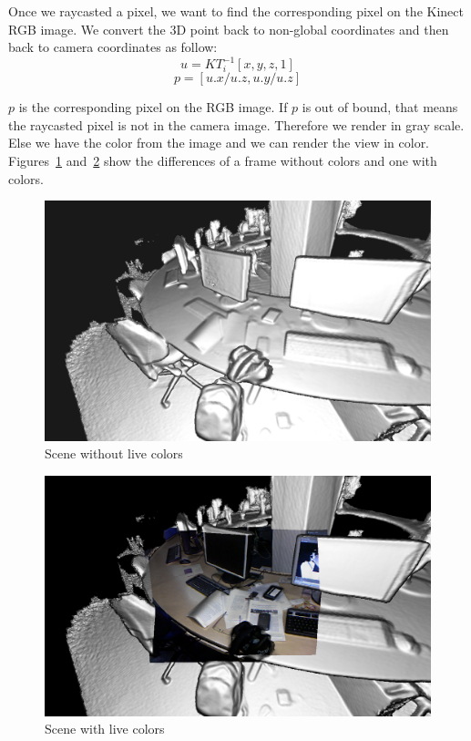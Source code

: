 \documentclass[12pt]{article}
\begin{document}
Once we raycasted a pixel, we want to find the corresponding pixel on the Kinect RGB image. We convert the 3D point back to non-global coordinates and then back to camera coordinates as follow:
$$u = KT_{i}^{-1}[x, y, z, 1]$$
$$p = [u.x/u.z, u.y/u.z]$$

$p$ is the corresponding pixel on the RGB image. If $p$ is out of bound, that means the raycasted pixel is not in the camera image. Therefore we render in gray scale. Else we have the color from the image and we can render the view in color. Figures~\ref{fig:nanb} and~\ref{fig:colorex} show the differences of a frame without colors and one with colors.

\begin{figure}[!h]
  \centering
  \includegraphics[scale=0.3]{NBExample.png}
  \caption{\label{fig:nanb} Scene without live colors}
\end{figure}

\begin{figure}[!h]
  \centering
  \includegraphics[scale=0.3]{ColorExample.png}
  \caption{\label{fig:colorex} Scene with live colors}
\end{figure}
\end{document}
